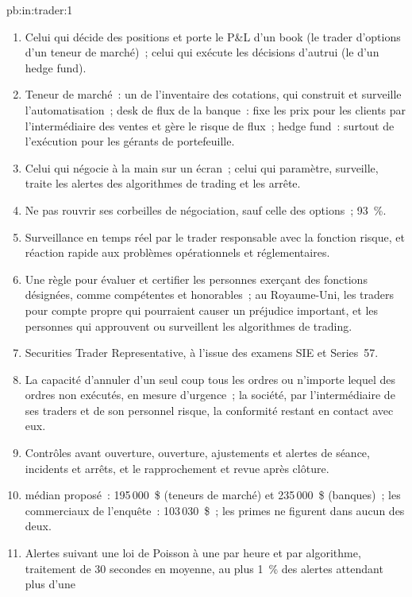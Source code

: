 \begin{solution}{pb:in:trader:1}
\begin{enumerate}
\item Celui qui décide des positions et porte le P\&L d'un book (le trader d'options d'un teneur de marché)~; celui qui exécute les
décisions d'autrui (le  d'un hedge fund).
\item Teneur de marché~: un  de l'inventaire des cotations, qui construit et surveille l'automatisation~; desk de flux de la banque~: fixe les prix pour les clients
par l'intermédiaire des ventes et gère le risque de flux~; hedge fund~: surtout de l'exécution pour les gérants de portefeuille.
\item Celui qui négocie à la main sur un écran~; celui qui paramètre, surveille, traite les alertes des algorithmes de trading et les arrête.
\item Ne pas rouvrir ses corbeilles de négociation, sauf celle des options~; 93~\%.
\item Surveillance en temps réel par le trader responsable avec la fonction risque, et réaction rapide aux problèmes opérationnels
et réglementaires.
\item Une règle pour évaluer et certifier les personnes exerçant des fonctions désignées, comme compétentes et honorables~; au Royaume-Uni, les traders pour compte propre qui pourraient
causer un préjudice important, et les personnes qui approuvent ou surveillent les algorithmes de trading.
\item Securities Trader Representative, à l'issue des examens SIE et Series~57.
\item La capacité d'annuler d'un seul coup tous les ordres ou n'importe lequel des ordres non exécutés, en mesure d'urgence~; la société, par l'intermédiaire de ses traders et
de son personnel risque, la conformité restant en contact avec eux.
\item Contrôles avant ouverture, ouverture, ajustements et alertes de séance, incidents et arrêts, et le
rapprochement et revue après clôture.
\item {} médian proposé~: 195\,000~\$ (teneurs de marché) et 235\,000~\$ (banques)~; les commerciaux de l'enquête~: 103\,030~\$~; les primes ne
figurent dans aucun des deux.
\item Alertes suivant une loi de Poisson à une par heure et par algorithme, traitement de 30 secondes en moyenne, au plus 1~\% des alertes attendant plus d'une

\end{enumerate}
\end{solution}
